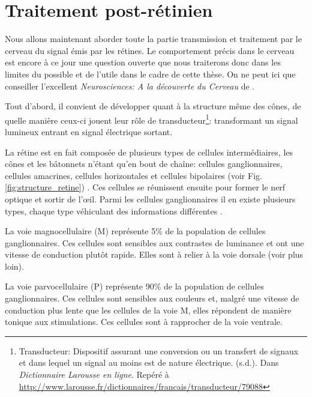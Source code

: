 	\section{Traitement post-rétinien}
	\par Nous allons maintenant aborder toute la partie transmission et traitement par le cerveau du signal émis par les rétines. Le comportement précis dans le cerveau est encore à ce jour une question ouverte que nous traiterons donc dans les limites du possible et de l'utile dans le cadre de cette thèse. On ne peut ici que conseiller l'excellent \textit{Neurosciences: A la découverte du Cerveau} de \citep{bear_neurosciences:_2007}.
	
	\par Tout d'abord, il convient de développer quant à la structure même des cônes, de quelle manière ceux-ci jouent leur rôle de transducteur\footnote{Transducteur: Dispositif assurant une conversion ou un transfert de signaux et dans lequel un signal au moins est de nature électrique. (s.d.). Dans \textit{Dictionnaire Larousse en ligne}. Repéré à \url{http://www.larousse.fr/dictionnaires/francais/transducteur/79088}}: transformant un signal lumineux entrant en signal électrique sortant.
	
	\par La rétine est en fait composée de plusieurs types de cellules intermédiaires, les cônes et les bâtonnets n'étant qu'en bout de chaîne: cellules ganglionnaires, cellules amacrines, cellules horizontales et cellules bipolaires (voir Fig. \ref{fig:structure_retine}) \citep{bear_neurosciences:_2007}. Ces cellules se réunissent ensuite pour former le nerf optique et sortir de l'œil. Parmi les cellules ganglionnaires il en existe plusieurs types, chaque type véhiculant des informations différentes \citep{anses_effets_2014}.
	
	\par La voie magnocellulaire (M) représente 5\% de la population de cellules ganglionnaires. Ces cellules sont sensibles aux contrastes de luminance et ont une vitesse de conduction plutôt rapide. Elles sont à relier à la voie dorsale (voir plus loin).
	
	\par La voie parvocellulaire (P) représente 90\% de la population de cellules ganglionnaires. Ces cellules sont sensibles aux couleurs et, malgré une vitesse de conduction plus lente que les cellules de la voie M, elles répondent de manière tonique aux stimulations. Ces cellules sont à rapprocher de la voie ventrale.
	
